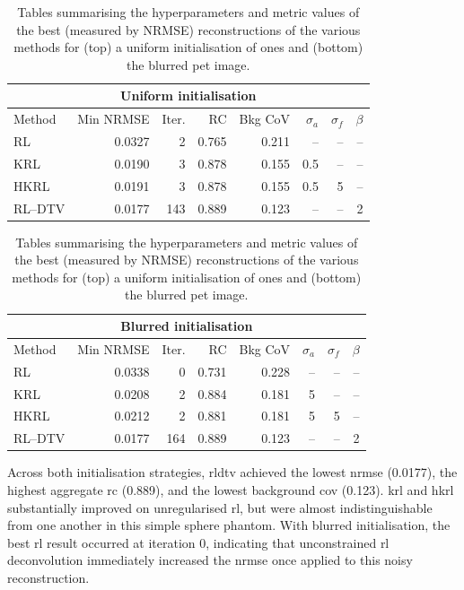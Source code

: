 \begin{table}[hbtp]
\centering
\small
\setlength{\tabcolsep}{5pt}
\renewcommand{\arraystretch}{1.15}

\begin{tabular}{lrrrrrrr}
\toprule
\multicolumn{8}{c}{\textbf{Uniform initialisation}}\\
\midrule
Method & Min NRMSE & Iter. & RC & Bkg CoV & $\sigma_a$ & $\sigma_f$ & $\beta$ \\
\midrule
RL     & 0.0327 & 2   & 0.765& 0.211& --   & --  & -- \\
KRL    & 0.0190 & 3   & 0.878& 0.155& 0.5  & --  & -- \\
HKRL   & 0.0191 & 3   & 0.878& 0.155& 0.5  & 5   & -- \\
RL--DTV & 0.0177 & 143 & 0.889& 0.123& --   & --  & 2  \\
\bottomrule
\end{tabular}

\vspace{0.8em}

\begin{tabular}{lrrrrrrr}
\toprule
\multicolumn{8}{c}{\textbf{Blurred initialisation}}\\
\midrule
Method & Min NRMSE & Iter. & RC & Bkg CoV & $\sigma_a$ & $\sigma_f$ & $\beta$ \\
\midrule
RL     & 0.0338 & 0   & 0.731& 0.228& -- & -- & -- \\
KRL    & 0.0208 & 2   & 0.884& 0.181& 5  & -- & -- \\
HKRL   & 0.0212 & 2   & 0.881& 0.181& 5  & 5 & -- \\
RL--DTV & 0.0177 & 164 & 0.889& 0.123& -- & -- & 2  \\
\bottomrule
\end{tabular}
\caption{Tables summarising the hyperparameters and metric values of the best (measured by NRMSE) reconstructions of the various methods for (top) a uniform initialisation of ones and (bottom) the blurred \gls{pet} image.}
\label{tab:spheres_krl}
\end{table}

Across both initialisation strategies, \gls{rldtv} achieved the lowest \gls{nrmse} (0.0177), the highest aggregate \gls{rc} (0.889), and the lowest background \gls{cov} (0.123). \gls{krl} and \gls{hkrl} substantially improved on unregularised \gls{rl}, but were almost indistinguishable from one another in this simple sphere phantom. With blurred initialisation, the best \gls{rl} result occurred at iteration 0, indicating that unconstrained \gls{rl} deconvolution immediately increased the \gls{nrmse} once applied to this noisy reconstruction.


